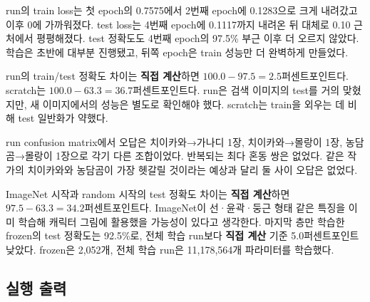 \documentclass[11pt]{article}
\begin{document}
\begin{center}
\hfill
{}
\end{center}
\begin{center}
\hfill
{}
\end{center}
\begin{center}
\hfill
{}
\end{center}
\begin{center}
\hfill
{}
\end{center}

run의 train loss는 첫 epoch의 0.7575에서 2번째 epoch에 0.1283으로 크게
내려갔고 이후 0에 가까워졌다. test loss는 4번째 epoch에 0.1117까지
내려온 뒤 대체로 0.10 근처에서 평평해졌다. test 정확도도 4번째 epoch의
97.5\% 부근 이후 더 오르지 않았다. 학습은 초반에 대부분 진행됐고,
뒤쪽 epoch은 train 성능만 더 완벽하게 만들었다.

run의 train/test 정확도 차이는 \textbf{직접 계산}하면
$100.0-97.5=2.5$퍼센트포인트다. scratch는 $100.0-63.3=36.7$퍼센트포인트다.
run은 검색 이미지의 test를 거의 맞혔지만, 새 이미지에서의 성능은 별도로
확인해야 했다. scratch는 train을 외우는 데 비해 test 일반화가 약했다.

run confusion matrix에서 오답은 치이카와→가나디 1장, 치이카와→몰랑이 1장,
농담곰→몰랑이 1장으로 각기 다른 조합이었다. 반복되는 최다 혼동 쌍은
없었다. 같은 작가의 치이카와와 농담곰이 가장 헷갈릴 것이라는 예상과 달리
둘 사이 오답은 없었다.

ImageNet 시작과 random 시작의 test 정확도 차이는 \textbf{직접 계산}하면
$97.5-63.3=34.2$퍼센트포인트다. ImageNet이 선·윤곽·둥근 형태 같은 특징을
이미 학습해 캐릭터 그림에 활용했을 가능성이 있다고 생각한다. 마지막 층만
학습한 frozen의 test 정확도는 92.5\%로, 전체 학습 run보다
\textbf{직접 계산} 기준 5.0퍼센트포인트 낮았다. frozen은 2,052개,
전체 학습 run은 11,178,564개 파라미터를 학습했다.

\subsection*{실행 출력}
\end{document}
